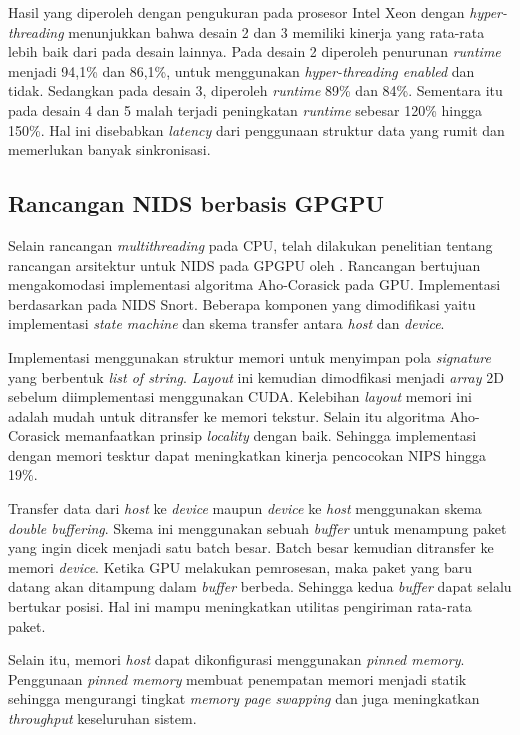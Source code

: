     Hasil yang diperoleh dengan pengukuran pada prosesor Intel Xeon dengan \emph{hyper-threading} menunjukkan bahwa desain 2 dan 3 memiliki kinerja yang rata-rata lebih baik dari pada desain lainnya. Pada desain 2 diperoleh penurunan \emph{runtime} menjadi 94,1\% dan 86,1\%, untuk menggunakan \emph{hyper-threading enabled} dan tidak. Sedangkan pada desain 3, diperoleh \emph{runtime} 89\% dan 84\%. Sementara itu pada desain 4 dan 5 malah terjadi peningkatan \emph{runtime} sebesar 120\% hingga 150\%. Hal ini disebabkan \emph{latency} dari penggunaan struktur data yang rumit dan memerlukan banyak sinkronisasi.

  \subsection{Rancangan NIDS berbasis GPGPU}

    Selain rancangan \emph{multithreading} pada CPU, telah dilakukan penelitian tentang rancangan arsitektur untuk NIDS pada GPGPU oleh \cite{gnort2008}. Rancangan bertujuan mengakomodasi implementasi algoritma Aho-Corasick pada GPU. Implementasi berdasarkan pada NIDS Snort. Beberapa komponen yang dimodifikasi yaitu implementasi \emph{state machine} dan skema transfer antara \emph{host} dan \emph{device}. 

    Implementasi menggunakan struktur memori untuk menyimpan pola \emph{signature} yang berbentuk \emph{list of string}. \emph{Layout} ini kemudian dimodfikasi menjadi \emph{array} 2D sebelum diimplementasi menggunakan CUDA. Kelebihan \emph{layout} memori ini adalah mudah untuk ditransfer ke memori tekstur. Selain itu algoritma Aho-Corasick memanfaatkan prinsip \emph{locality} dengan baik. Sehingga implementasi dengan memori tesktur dapat meningkatkan kinerja pencocokan NIPS hingga 19\%.

    Transfer data dari \emph{host} ke \emph{device} maupun \emph{device} ke \emph{host} menggunakan skema \emph{double buffering}. Skema ini menggunakan sebuah \emph{buffer} untuk menampung paket yang ingin dicek menjadi satu batch besar. Batch besar kemudian ditransfer ke memori \emph{device}. Ketika GPU melakukan pemrosesan, maka paket yang baru datang akan ditampung dalam \emph{buffer} berbeda. Sehingga kedua \emph{buffer} dapat selalu bertukar posisi. Hal ini mampu meningkatkan utilitas pengiriman rata-rata paket. 
    
    Selain itu, memori \emph{host} dapat dikonfigurasi menggunakan \emph{pinned memory}. Penggunaan \emph{pinned memory} membuat penempatan memori menjadi statik sehingga mengurangi tingkat \emph{memory page swapping} dan juga meningkatkan \emph{throughput} keseluruhan sistem.

